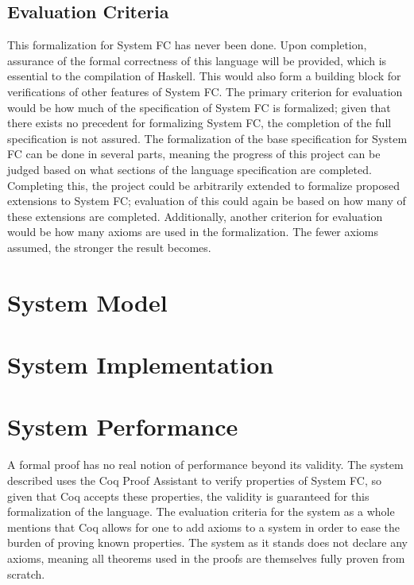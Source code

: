 \documentclass{sig-alternate}
\begin{document}
\subsection{Evaluation Criteria}
\label{subsec:eval_criteria}
This formalization for System FC has never been done. Upon completion, assurance of the formal correctness of this language will be provided, which is essential to the compilation of Haskell. This would also form a building block for verifications of other features of System FC.
The primary criterion for evaluation would be how much of the specification of System FC is formalized; given that there exists no precedent for formalizing System FC, the completion of the full specification is not assured. The formalization of the base specification for System FC can be done in several parts, meaning the progress of this project can be judged based on what sections of the language specification are completed. Completing this, the project could be arbitrarily extended to formalize proposed extensions to System FC; evaluation of this could again be based on how many of these extensions are completed. Additionally, another criterion for evaluation would be how many axioms are used in the formalization. The fewer axioms assumed, the stronger the result becomes.

\section{System Model}
\section{System Implementation}
\section{System Performance}
\label{sec:performance}
A formal proof has no real notion of performance beyond its validity. The system described uses the Coq Proof Assistant to verify properties of System FC, so given that Coq accepts these properties, the validity is guaranteed for this formalization of the language. The evaluation criteria for the system as a whole mentions that Coq allows for one to add axioms to a system in order to ease the burden of proving known properties. The system as it stands does not declare any axioms, meaning all theorems used in the proofs are themselves fully proven from scratch.
\end{document}
